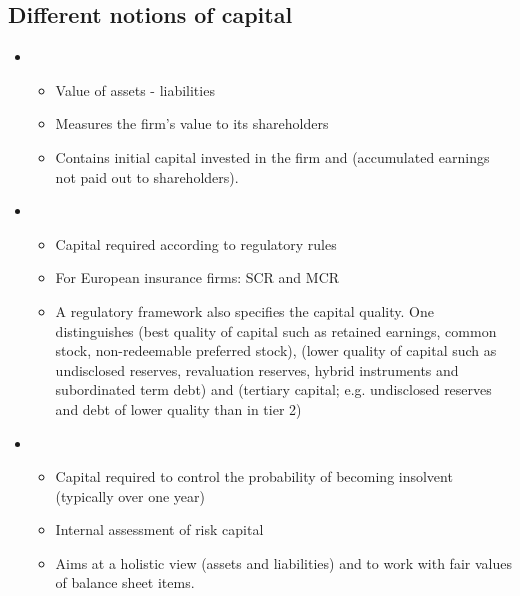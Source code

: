 \subsection*{Different notions of capital}
\begin{itemize}[leftmargin=*]
    \item {}
    \begin{itemize}[leftmargin=*]
        \item Value of assets - liabilities
        \item Measures the firm’s value to its shareholders
        \item Contains initial capital invested in the firm and  (accumulated earnings not paid
out to shareholders).
    \end{itemize}
    


    \item {}
    \begin{itemize}[leftmargin=*]
        \item Capital required according to regulatory rules
        \item For European insurance firms: SCR and MCR
        \item A regulatory framework also specifies the capital quality. One distinguishes  (best
quality of capital such as retained earnings, common stock, non-redeemable preferred stock),
 (lower quality of capital such as undisclosed reserves, revaluation reserves, hybrid
instruments and subordinated term debt) and  (tertiary capital; e.g. undisclosed
reserves and debt of lower quality than in tier 2)
    \end{itemize}



        \item {}
    \begin{itemize}[leftmargin=*]
        \item Capital required to control the probability of becoming insolvent (typically over one year)
        \item Internal assessment of risk capital
        \item Aims at a holistic view (assets and liabilities) and to work with fair values of balance sheet items.
    \end{itemize}

\end{itemize}



